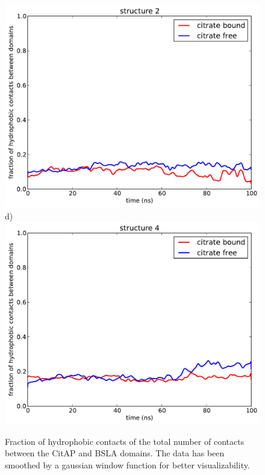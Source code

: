 \documentclass[english, a4paper, 12pt, titlepage, draft]{article}
\begin{document}
\begin{figure}
\begin{minipage}[]{0.45\linewidth}
        \includegraphics[width=\textwidth]{figures/Complex_hydrophobic_core/hydrophobic_cont_structure2.pdf}  
        d)
        \includegraphics[width=\textwidth]{figures/Complex_hydrophobic_core/hydrophobic_cont_structure4.pdf}  
    \end{minipage}
    \caption{Fraction of hydrophobic contacts of the total number of contacts between the CitAP and BSLA domains.
        The data has been smoothed by a gaussian window function for better visualizability.}
\label{fig:hydrophobic_contacts}
\end{figure}    
\end{document}
